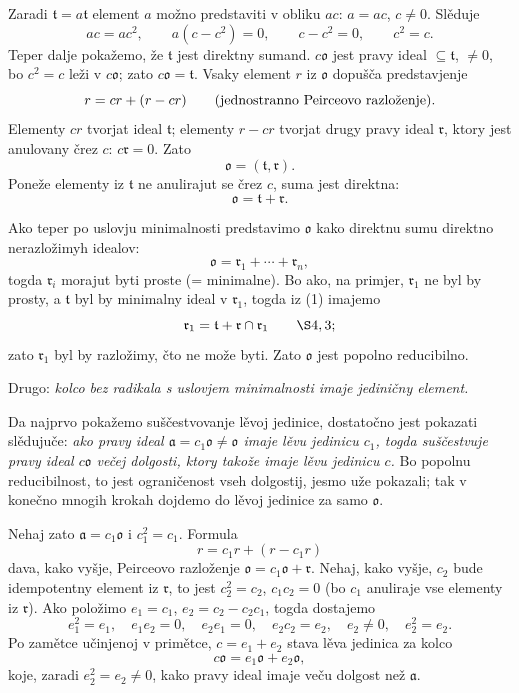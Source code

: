 \documentclass[11pt]{article}
\providecommand{\ma}{\mathfrak{a}}
\providecommand{\mo}{\mathfrak{o}}
\providecommand{\mr}{\mathfrak{r}}
\providecommand{\mt}{\mathfrak{t}}
\begin{document}
Zaradi $\mt=a\mt$ element $a$ možno predstaviti v obliku $ac$: $a=ac$, $c\ne0$. Slěduje
\[
        ac=ac^2,
        \qquad a(c-c^2)=0,
        \qquad c-c^2=0,
        \qquad c^2=c.
\]
Teper dalje pokažemo, že $\mt$ jest direktny sumand. $c\mo$ jest pravy ideal $\subseteq\mt$, $\ne0$, bo $c^2=c$ leži v $c\mo$; zato $c\mo=\mt$. Vsaky element $r$ iz $\mo$ dopušča predstavjenje
\[
        r=cr+(r-cr) \qquad \hbox{(jednostranno Peirceovo razloženje).}
\]
Elementy $cr$ tvorjat ideal $\mt$; elementy $r-cr$ tvorjat drugy pravy ideal $\mr$, ktory jest anulovany črez $c$: $c\mr=0$. Zato
\[
        \mo=(\mt,\mr).
\]
Poneže elementy iz $\mt$ ne anulirajut se črez $c$, suma jest direktna:
\begin{equation}
        \mo=\mt+\mr.                                             \tag{1}
\end{equation}

Ako teper po uslovju minimalnosti predstavimo $\mo$ kako direktnu sumu direktno nerazložimyh idealov:
\[
        \mo=\mr_1+\cdots+\mr_n,
\]
togda $\mr_i$ morajut byti proste (= minimalne). Bo ako, na primjer, $\mr_1$ ne byl by prosty, a $\mt$ byl by minimalny ideal v $\mr_1$, togda iz (1) imajemo
\[
        \mr_1=\mt+\mr\cap\mr_1 \qquad \hbox{\(\S 4,3\)};
\]
zato $\mr_1$ byl by razložimy, čto ne može byti. Zato $\mo$ jest popolno reducibilno.

Drugo: \emph{kolco bez radikala s uslovjem minimalnosti imaje jediničny element.}

Da najprvo pokažemo suščestvovanje lěvoj jedinice, dostatočno jest pokazati slědujuče: \emph{ako pravy ideal $\ma=c_1\mo\ne\mo$ imaje lěvu jedinicu $c_1$, togda suščestvuje pravy ideal $c\mo$ večej dolgosti, ktory takože imaje lěvu jedinicu $c$.} Bo popolnu reducibilnost, to jest ograničenost vseh dolgostij, jesmo uže pokazali; tak v konečno mnogih krokah dojdemo do lěvoj jedinice za samo $\mo$.

Nehaj zato $\ma=c_1\mo$ i $c_1^2=c_1$. Formula
\[
        r=c_1r+(r-c_1r)
\]
dava, kako vyšje, Peirceovo razloženje $\mo=c_1\mo+\mr$. Nehaj, kako vyšje, $c_2$ bude idempotentny element iz $\mr$, to jest $c_2^2=c_2$, $c_1c_2=0$ (bo $c_1$ anuliraje vse elementy iz $\mr$). Ako položimo $e_1=c_1$, $e_2=c_2-c_2c_1$, togda dostajemo
\[
        e_1^2=e_1,
        \quad e_1e_2=0,
        \quad e_2e_1=0,
        \quad e_2c_2=e_2,
        \quad e_2\ne0,
        \quad e_2^2=e_2.
\]
Po zamětce učinjenoj v primětce, $c=e_1+e_2$ stava lěva jedinica za kolco
\[
        c\mo=e_1\mo+e_2\mo,
\]
koje, zaradi $e_2^2=e_2\ne0$, kako pravy ideal imaje veču dolgost než $\ma$.
\end{document}
